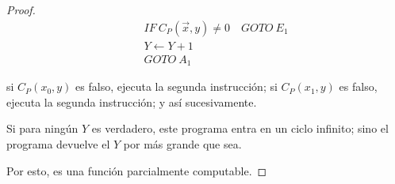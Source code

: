 \begin{proof} \phantom{.}

    \begin{align*}
        [A_1] \quad &IF ~ C_P(\overrightarrow{x},y) \neq 0 \quad GOTO ~ E_1\\
                    &Y \gets Y + 1 \\
                    &GOTO ~ A_1
    \end{align*} 

    si $C_P(x_0, y)$ es falso, ejecuta la segunda instrucción; 
    si $C_P(x_1, y)$ es falso, ejecuta la segunda instrucción;
    y así sucesivamente.

   Si para ningún $Y$ es verdadero, este programa entra en un ciclo infinito; 
   sino el programa devuelve el $Y$ por más grande que sea.

   Por esto, es una función parcialmente computable.
\end{proof}
